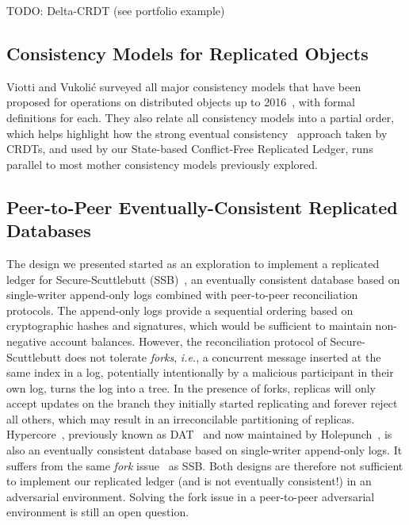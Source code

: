 \documentclass[9pt, oneside]{article}   	%
\begin{document}
TODO: Delta-CRDT (see portfolio example)~\cite{Almeida2018delta}

\subsection{Consistency Models for Replicated Objects}

Viotti and  Vukoli\'{c} surveyed all major consistency models that have been proposed for operations on distributed objects up to 2016~\cite{viotti2016consistency-db-survey}, with formal definitions for each. They also relate all consistency models into a partial order, which helps highlight how the strong eventual consistency~\cite{shapiro:hal-00932836} approach taken by CRDTs, and used by our State-based Conflict-Free Replicated Ledger, runs parallel to most mother consistency models previously explored.

\subsection{Peer-to-Peer Eventually-Consistent Replicated Databases}
\label{sec:p2p-db}

The design we presented started as an exploration to implement a replicated ledger for Secure-Scuttlebutt (SSB)~\cite{kermarrec2020gossiping,tarr2019ssb}, an eventually consistent database based on single-writer append-only logs combined with peer-to-peer reconciliation protocols. The append-only logs provide a sequential ordering based on cryptographic hashes and signatures, which would be sufficient to maintain non-negative account balances. However, the reconciliation protocol of Secure-Scuttlebutt does not tolerate \textit{forks}, \textit{i.e.}, a concurrent message inserted at the same index in a log, potentially intentionally by a malicious participant in their own log, turns the log into a tree. In the presence of forks, replicas will only accept updates on the branch they initially started replicating and forever reject all others, which may result in an irreconcilable partitioning of replicas. Hypercore~\cite{hypercore-website}, previously known as DAT~\cite{ogden2017dat,robinson2018dat} and now maintained by Holepunch~\cite{holepunch-website}, is also an eventually consistent database based on single-writer append-only logs. It suffers from the same \textit{fork} issue~\cite{hypercore-handling-conflicts,hypercore-split-resolution-dep}  as SSB. Both designs are therefore not sufficient to implement our replicated ledger (and is not eventually consistent!) in an adversarial environment. Solving the fork issue in a peer-to-peer adversarial environment is still an open question.
 
\end{document}

